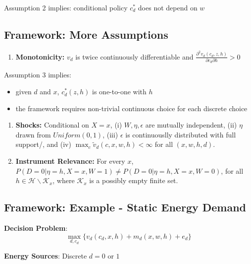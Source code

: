 \documentclass[
  letterpaper,
  DIV=11,
  numbers=noendperiod]{scrartcl}
\providecommand{\tightlist}{%
  \setlength{\itemsep}{0pt}\setlength{\parskip}{0pt}}\usepackage{longtable,booktabs,array}
\begin{document}
Assumption 2 implies: conditional policy \(c^{*}_d\) does not depend on
\(w\)

\subsection{Framework: More
Assumptions}\label{framework-more-assumptions}

\begin{enumerate}
\def\labelenumi{\arabic{enumi}.}
\setcounter{enumi}{2}
\tightlist
\item
  \textbf{Monotonicity:} \(v_d\) is twice continuously differentiable
  and \(\frac{\partial^2v_d(c_d,z,h)}{\partial c_d \partial h} > 0\)
\end{enumerate}

Assumption 3 implies:

\begin{itemize}
\tightlist
\item
  given \(d\) and \(x\), \(c^{*}_d(z,h)\) is one-to-one with \(h\)\\
\item
  the framework requires non-trivial continuous choice for each discrete
  choice
\end{itemize}

\begin{enumerate}
\def\labelenumi{\arabic{enumi}.}
\setcounter{enumi}{3}
\item
  \textbf{Shocks:} Conditional on \(X = x\), (i) \(W, \eta, \epsilon\)
  are mutually independent, (ii) \(\eta\) drawn from \(Uniform(0,1)\),
  (iii) \(\epsilon\) is continuouslly distributed with full support/,
  and (iv) \(\max_{c} \tilde{v}_d (c, x,w,h) < \infty\) for all
  \((x,w,h,d)\).
\item
  \textbf{Instrument Relevance:} For every \(x\),
  \(P(D = 0 | \eta = h, X = x, W = 1) \neq P(D = 0 | \eta = h, X = x, W = 0)\),
  for all \(h \in \mathcal{H} \backslash \mathcal{K}_x\), where
  \(\mathcal{K}_x\) is a possibly empty finite set.
\end{enumerate}

\subsection{Framework: Example - Static Energy
Demand}\label{framework-example---static-energy-demand}

\textbf{Decision Problem}:
\[\max_{d, c_d} \{v_d(c_d,x,h) + m_d(x,w,h) + e_d \}\]

\textbf{Energy Sources}: Discrete \(d = 0 \text{ or } 1\)
\end{document}
